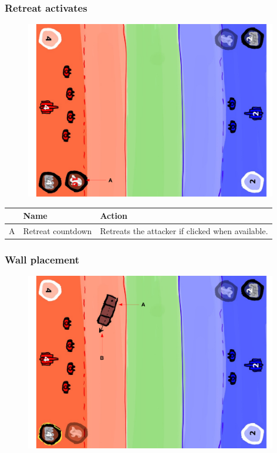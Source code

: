 \documentclass[12pt,a4paper]{article}
\begin{document}
\subsubsection{Retreat activates}
\begin{figure}[H]
  \centering
  \includegraphics[width=11cm]{pic/mocks/6-5.pdf}
\end{figure}

\begin{table}[H]
\small
\centering
\begin{tabular}{c|p{5cm}|p{7cm}}
& Name & Action \\ \hline\hline
A
&Retreat countdown
&Retreats the attacker if clicked when available.
\end{tabular}
\end{table}

\newpage
\subsubsection{Wall placement}
\begin{figure}[H]
  \centering
  \includegraphics[width=11cm]{pic/mocks/6-6.pdf}
\end{figure}
\end{document}
